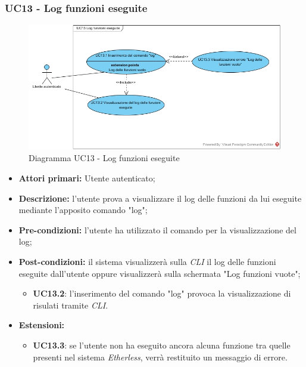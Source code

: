 \subsubsection{UC13 - Log funzioni eseguite}
\begin{figure}[h]
	\centering
	\includegraphics[width=\linewidth]{res/img/UC13.jpg}
	\caption{Diagramma UC13 - Log funzioni eseguite}
\end{figure}
\begin{itemize}
	\item \textbf{Attori primari:} Utente autenticato;
	\item \textbf{Descrizione:} l'utente prova a visualizzare il log delle funzioni da lui eseguite mediante l'apposito comando "log";
	\item \textbf{Pre-condizioni:} l'utente ha utilizzato il comando per la visualizzazione del log;
	\item \textbf{Post-condizioni:} il sistema visualizzerà sulla \textit{CLI\glo} il log delle funzioni eseguite dall'utente oppure visualizzerà sulla schermata "Log funzioni vuote";
	\begin{itemize}
		\item \textbf{UC13.2}: l'inserimento del comando "log" provoca la visualizzazione di risulati tramite \textit{CLI\glos}.
	\end{itemize}
	\item \textbf{Estensioni:}
	\begin{itemize}
		\item \textbf{UC13.3}: se l'utente non ha eseguito ancora alcuna funzione tra quelle presenti nel sistema \textit{Etherless\glos}, verrà restituito un messaggio di errore.
	\end{itemize}
\end{itemize}

